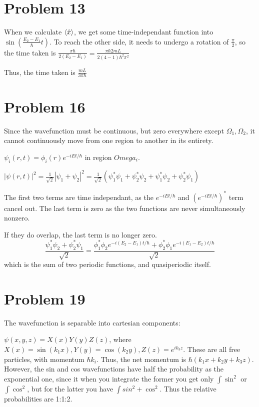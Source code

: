 \documentclass[12pt]{article}
\begin{document}
\section*{Problem 13}

When we calculate $\Braket{\hat x}$, we get some time-independant function into $\sin(\frac{E_2-E_1}{\hbar}t)$. To reach the other side, it needs to undergo a rotation of $\frac\pi2$, so the time taken is $
\frac{\pi\hbar}{2(E_2-E_1)}=\frac{\pi\hbar 2 m L}{2(4-1)\hbar^2\pi^2}$

Thus, the time taken is $\frac{mL}{3\pi\hbar}$

\section*{Problem 16}
Since the wavefunction must be continuous, but zero everywhere except $\Omega_1,\Omega_2$, it cannot continuously move from one region to another in its entirety.

$\psi_i(r,t)=\phi_i(r)e^{-iEt/\hbar}$ in region $Omega_i$.

$|\psi(r,t)|^2=\frac1{\sqrt{2}}|\psi_1+\psi_2|^2=\frac1{\sqrt{2}}\left(\psi_1^*\psi_1+\psi_2^*\psi_2+\psi_1^*\psi_2+\psi_2^*\psi_1\right)$

The first two terms are time independant, as the $e^{-iEt/\hbar}$ and $\left(e^{-iEt/\hbar}\right)^*$ term cancel out. The last term is zero as the two functions are never simultaneously nonzero.

If they do overlap, the last term is no longer zero. $$\frac{\psi_1^*\psi_2+\psi_2^*\psi_1}{\sqrt{2}}=\frac{\phi_1^*\phi_2 e^{-i(E_2-E_1)t/\hbar} + \phi_2^*\phi_1 e^{-i(E_1-E_2)t/\hbar}}{\sqrt{2}}$$ which is the sum of two periodic functions, and quasiperiodic itself.

\section*{Problem 19}

The wavefunction is separable into cartesian components:

$\psi(x,y,z)=X(x)Y(y)Z(z)$, where $X(x)=\sin(k_1 x), Y(y)=\cos(k_2 y), Z(z)=e^{ik_3z}$. These are all free particles, with momentum $\hbar k_i$. Thus, the net momentum is $\hbar\left(k_1x+k_2y+k_3z\right)$. However, the sin and cos wavefunctions have half the probability as the exponential one, since it when you integrate the former you get only $\int \sin^2$ or $\int \cos^2$, but for the latter you have $\int sin^2+\cos^2$. Thus the relative probabilities are 1:1:2.
\end{document}
